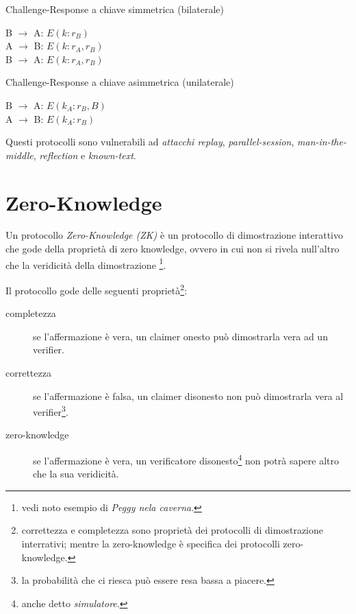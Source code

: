 \bigskip
\begin{algorithm}[H]
  \caption{Challenge-Response a chiave simmetrica (bilaterale)}
  \label{alg:authentication-challenge-response-bilateral-symmetric}
  \SetAlgoNoLine
  B $\rightarrow$ A: $E(k:r_{B})$\\
  A $\rightarrow$ B: $E(k:r_{A},r_{B})$\\
  B $\rightarrow$ A: $E(k:r_{A},r_{B})$\\
\end{algorithm}

\bigskip
\begin{algorithm}[H]
  \caption{Challenge-Response a chiave asimmetrica (unilaterale)}
  \label{alg:authentication-challenge-response-unilateral-asymmetric}
  \SetAlgoNoLine
  B $\rightarrow$ A: $E(k_{A}:r_{B},B)$\\
  A $\rightarrow$ B: $E(k_{A}:r_{B})$\\
\end{algorithm}
\bigskip

Questi protocolli sono vulnerabili ad \textit{attacchi replay}, \textit{parallel-session}, \textit{man-in-the-middle}, \textit{reflection} e \textit{known-text}.


\section{Zero-Knowledge}
Un protocollo \textit{Zero-Knowledge (ZK)} è un protocollo di dimostrazione interattivo che gode della proprietà di zero knowledge, ovvero in cui non si rivela null'altro che la veridicità della dimostrazione \footnote{vedi noto esempio di \textit{Peggy nela caverna}.}.

Il protocollo gode delle seguenti proprietà\footnote{correttezza e completezza sono proprietà dei protocolli di dimostrazione interrativi; mentre la zero-knowledge è specifica dei protocolli zero-knowledge.}:
\begin{description}
  \item[completezza] se l'affermazione è vera, un claimer onesto può dimostrarla vera ad un verifier.
  \item[correttezza] se l'affermazione è falsa, un claimer disonesto non può dimostrarla vera al verifier\footnote{la probabilità che ci riesca può essere resa bassa a piacere.}.
  \item[zero-knowledge] se l'affermazione è vera, un verificatore disonesto\footnote{anche detto \textit{simulatore}.} non potrà sapere altro che la sua veridicità.
\end{description}

